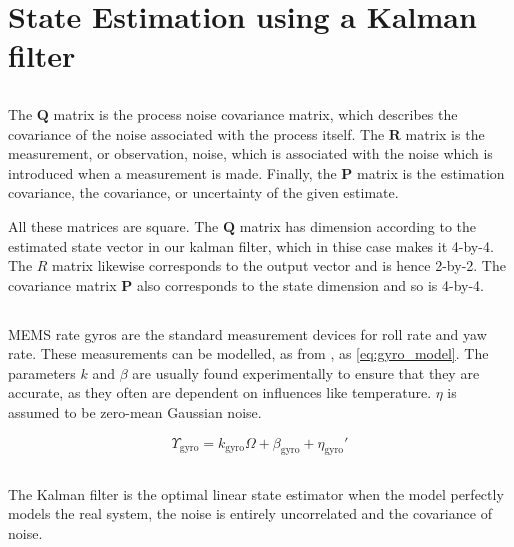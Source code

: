 \section{State Estimation using a Kalman filter}

\subsection{} %
The $\mathbf{Q}$ matrix is the process noise covariance matrix, which describes the covariance of the noise associated with the process itself.  The $\mathbf{R}$ matrix is the measurement, or observation, noise, which is associated with the noise which is introduced when a measurement is made. Finally, the $\mathbf{P}$ matrix is the estimation covariance, the covariance, or uncertainty of the given estimate.

All these matrices are square. The $\mathbf{Q}$ matrix has dimension according to the estimated state vector in our kalman filter, which in thise case makes it 4-by-4. The $R$ matrix likewise corresponds to the output vector and is hence 2-by-2. The covariance matrix $\mathbf{P}$ also corresponds to the state dimension and so is 4-by-4.

\subsection{} %
MEMS rate gyros are the standard measurement devices for roll rate and yaw rate. These measurements can be modelled, as from \cite[p. 125]{beard_mclain_2012}, as \eqref{eq:gyro_model}. The parameters $k$ and $\beta$ are usually found experimentally to ensure that they are accurate, as they often are dependent on influences like temperature. $\eta$ is assumed to be zero-mean Gaussian noise. 

\begin{equation}
    \label{eq:gyro_model}
    \Upsilon_{\text{gyro}} = k_{\text{gyro}} \Omega + \beta_{\text{gyro}} + \eta_{\text{gyro}}'
\end{equation}





\subsection{} %
The Kalman filter is the optimal linear state estimator when the model perfectly models the real system, the noise is entirely uncorrelated and the covariance of noise. 


\subsection{} %


